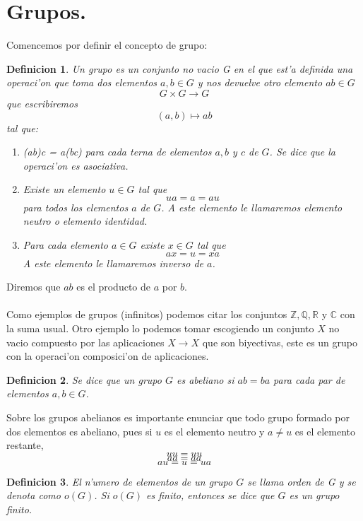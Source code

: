 \documentclass[a4paper,openright,12pt]{report}
\numberwithin{equation}{section} %
\newtheorem{definicion}{Definicion}[section] %
\begin{document}
\section{Grupos.}
Comencemos por definir el concepto de grupo:
\begin{definicion}
Un grupo es un conjunto no vacio G en el que est'a definida una operaci'on que toma dos elementos $a,b \in G$ y nos devuelve otro elemento $ab \in G$
 \[G \times G \rightarrow G \]
que escribiremos \[ (a,b) \mapsto ab \]
tal que:
\begin{enumerate}
\item \textit{(ab)c} = \textit{a(bc)} para cada terna de elementos $a,b$ y $c$ de $G$. Se dice que la operaci'on es \textit{asociativa}.
\item Existe un elemento $u \in G$ tal que \[ua =a=au\] para todos los elementos $a$ de $G$. A este elemento le llamaremos \textit{elemento neutro o elemento identidad}.
\item Para cada elemento $a \in G$ existe $x \in G$ tal que \[ax=u=xa\] A este elemento le llamaremos \textit{inverso} de $a$.
\end{enumerate}
\end{definicion}
Diremos que $ab$ es el producto de $a$ por $b$.\\
\\
Como ejemplos de grupos (infinitos) podemos citar los conjuntos $ \mathbb{Z}, \mathbb{Q}, \mathbb{R}$ y $ \mathbb{C}$ con la suma usual. Otro ejemplo lo podemos tomar escogiendo un conjunto $X$ no vacio compuesto por las aplicaciones $X \rightarrow X$ que son biyectivas, este es un grupo con la operaci'on composici'on de aplicaciones.
\begin{definicion}
Se dice que un grupo $G$ es abeliano si $ab=ba$ para cada par de elementos $a,b \in G$.
\end{definicion}
Sobre los grupos abelianos es importante enunciar que todo grupo formado por dos elementos es abeliano, pues si $u$ es el elemento neutro y $a \neq u$ es el elemento restante, \[ uu=uu\] \[ aa=aa\] \[ au=u=ua\]
\begin{definicion}
El n'umero de elementos de un grupo $G$ se llama \textit{orden de G} y se denota como $o(G)$. Si $o(G)$ es finito, entonces se dice que $G$ es un \textit{grupo finito}.
\end{definicion}
\end{document}

